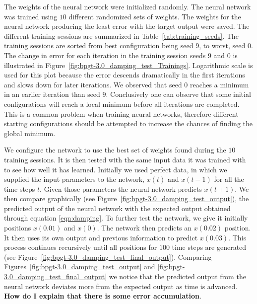 \documentclass[11pt]{article}
\begin{document}
The weights of the neural network were initialized randomly. The neural network was trained using $10$ different randomized sets of
weights. The weights for the neural network producing the least error with the target output were saved. The different training sessions
are summarized in Table~\ref{tab:training_seeds}. The training sessions are sorted from best configuration being seed $9$, to worst,
seed $0$. The change in error for each iteration in the training session seeds $9$ and $0$ is illustrated in
Figure~\ref{fig:bpgt-3.0_damping_test_Trainings}. Logarithmic scale is used for this plot because the error descends dramatically in the
first iterations and slows down for later iterations. We observed that seed $0$ reaches a minimum in an earlier iteration than seed $9$.
Conclusively one can observe that some initial configurations will reach a local minimum before all iterations are completed. This is a
common problem when training neural networks, therefore different starting configurations should be attempted to increase the chances of
finding the global minimum.

We configure the network to use the best set of weights found during the $10$ training sessions. It is then tested with the same input
data it was trained with to see how well it has learned. Initially we used perfect data, in which we supplied the input parameters to
the network, $x(t)$ and $x(t-1)$ for all the time steps $t$. Given those parameters the neural network predicts $x(t+1)$. We then
compare graphically (see Figure~\ref{fig:bpgt-3.0_damping_test_output}), the predicted output of the neural network with the expected
output obtained through equation \ref{eqn:damping}. To further test the network, we give it initially positions $x(0.01)$ and $x(0)$.
The network then predicts an $x(0.02)$ position. It then uses its own output and previous information to predict $x(0.03)$. This process
continues recursively until all positions for $100$ time steps are generated (see Figure~\ref{fig:bpgt-3.0_damping_test_final_output}).
Comparing Figures~\ref{fig:bpgt-3.0_damping_test_output} and \ref{fig:bpgt-3.0_damping_test_final_output} we notice that the predicted
output from the neural network deviates more from the expected output as time is advanced. \textbf{How do I explain that there is some
error accumulation}.
\end{document}
